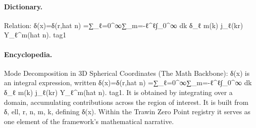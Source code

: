 \paragraph{Dictionary.}
Relation: δ(x)=δ(r,hat n) =∑\_ℓ=0\textasciicircum{}∞∑\_m=-ℓ\textasciicircum{}ℓ∫\_0\textasciicircum{}∞ dk δ\_ℓ m(k) j\_ℓ(kr) Y\_ℓ\textasciicircum{}m(hat n). tag1

\paragraph{Encyclopedia.}
Mode Decomposition in 3D Spherical Coordinates (The Math Backbone): δ(x) is an integral expression, written δ(x)=δ(r,hat n) =∑\_ℓ=0\textasciicircum{}∞∑\_m=-ℓ\textasciicircum{}ℓ∫\_0\textasciicircum{}∞ dk δ\_ℓ m(k) j\_ℓ(kr) Y\_ℓ\textasciicircum{}m(hat n). tag1. It is obtained by integrating over a domain, accumulating contributions across the region of interest. It is built from δ, ell, r, n, m, k, defining δ(x). Within the Trawin Zero Point registry it serves as one element of the framework's mathematical narrative.
